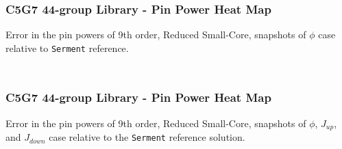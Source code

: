 \documentclass[fleqn]{beamer}
\begin{document}
  \begin{frame}
      \frametitle{C5G7 44-group Library - Pin Power Heat Map}
      \centering
      Error in the pin powers of 9th order, Reduced Small-Core, snapshots of 
      $\phi$ case relative to {\tt Serment} 
      reference.  
      \begin{columns}[T]
          \begin{column}{0.5\textwidth}
              \begin{figure}
              \end{figure}
          \end{column}
          \begin{column}{0.5\textwidth}
              \begin{figure}
              \end{figure}
          \end{column}
      \end{columns}
  \end{frame}
  
  \begin{frame}
      \frametitle{C5G7 44-group Library - Pin Power Heat Map}
      \centering
      Error in the pin powers of 9th order, Reduced Small-Core, snapshots of 
$\phi$, $J_{up}$, and $J_{down}$ case relative to the 
      {\tt Serment} reference solution.
      \begin{columns}[T]
          \begin{column}{0.5\textwidth}
              \begin{figure}
              \end{figure}
          \end{column}
          \begin{column}{0.5\textwidth}
              \begin{figure}
              \end{figure}
          \end{column}
      \end{columns}
  \end{frame}
  
\end{document}
